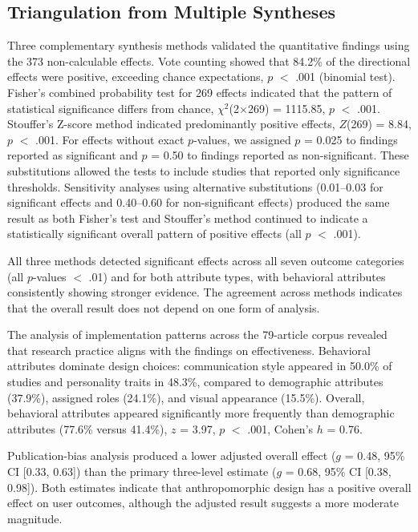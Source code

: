 \documentclass[preprint,review,12pt,authoryear,nonatbib]{elsarticle}
\begin{document}
\subsection{Triangulation from Multiple Syntheses} \label{sec:triang}

Three complementary synthesis methods validated the quantitative findings using the 373 non-calculable effects. Vote counting showed that 84.2\% of the directional effects were positive, exceeding chance expectations, $p$ $<$ .001 (binomial test). Fisher's combined probability test for 269 effects indicated that the pattern of statistical significance differs from chance, $\chi^2$(2$\times$269) = 1115.85, $p$ $<$ .001. Stouffer's Z-score method indicated predominantly positive effects, $Z$(269) = 8.84, $p$ $<$ .001. For effects without exact $p$-values, we assigned $p$ = 0.025 to findings reported as significant and $p$ = 0.50 to findings reported as non-significant. These substitutions allowed the tests to include studies that reported only significance thresholds. Sensitivity analyses using alternative substitutions (0.01--0.03 for significant effects and 0.40--0.60 for non-significant effects) produced the same result as both Fisher's test and Stouffer's method continued to indicate a statistically significant overall pattern of positive effects (all $p$ $<$ .001).

All three methods detected significant effects across all seven outcome categories (all $p$-values $<$ .01) and for both attribute types, with behavioral attributes consistently showing stronger evidence. The agreement across methods indicates that the overall result does not depend on one form of analysis.

The analysis of implementation patterns across the 79-article corpus revealed that research practice aligns with the findings on effectiveness. Behavioral attributes dominate design choices: communication style appeared in 50.0\% of studies and personality traits in 48.3\%, compared to demographic attributes (37.9\%), assigned roles (24.1\%), and visual appearance (15.5\%). Overall, behavioral attributes appeared significantly more frequently than demographic attributes (77.6\% versus 41.4\%), $z$ = 3.97, $p$ $<$ .001, Cohen's $h$ = 0.76.

Publication-bias analysis produced a lower adjusted overall effect ($g$ = 0.48, 95\% CI [0.33, 0.63]) than the primary three-level estimate ($g$ = 0.68, 95\% CI [0.38, 0.98]). Both estimates indicate that anthropomorphic design has a positive overall effect on user outcomes, although the adjusted result suggests a more moderate magnitude.
\end{document}
